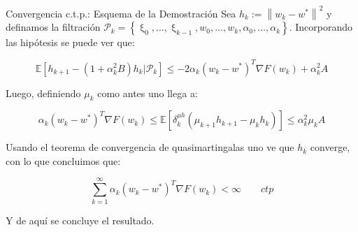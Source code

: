 \documentclass{beamer}
\newcommand{\F}{\mathcal{F}}
\newcommand{\norm}[1]{\left\lVert#1\right\rVert}
\newcommand{\sett}[1]{\left\lbrace#1\right\rbrace}
\newcommand{\expectation}[1]{\mathbb{E} \left[#1\right]}
\newcommand{\expectationfilt}[1]{\mathbb{E} \left[{#1} \vert \mathcal{P}_{k}\right]}
\begin{document}
%	
%	
%	
%	

\begin{frame}{Convergencia c.t.p.: Esquema de la Demostraci\'on}
Sea $h_k := \norm{w_k - w^*}^2$ y definamos  la filtraci\'on $\mathcal{P}_k = \sett{\upxi_{0}, \dots, \upxi_{k-1}, w_0, \dots, w_k, \alpha_0, \dots, \alpha_k}$. Incorporando las hip\'otesis se puede ver que:

\begin{footnotesize}
\begin{equation*}
\expectationfilt{h_{k+1} - \left(1 + \alpha_k^2 B\right)h_k } \leq  -2 \alpha_k \left(w_k - w^*\right)^T \nabla F(w_k) + \alpha_k^2 A
\end{equation*}
\end{footnotesize}

Luego, definiendo $\mu_k$ como antes uno llega a:

\begin{footnotesize}
\begin{equation*}
\alpha_k \left(w_k - w^* \right)^T\nabla F(w_k) \leq \expectation{\delta_k^{\mu h} \left(\mu_{k+1} h_{k+1} - \mu_k h_k \right)}  \leq  \alpha_k^2 \mu_k A
\end{equation*}
\end{footnotesize}


Usando el teorema de convergencia de quasimartingalas uno ve que $h_k$ converge, con lo que concluimos que:

\begin{footnotesize}
	\begin{equation*}
\sum\limits_{k=1}^{\infty} {\alpha_k \left(w_k - w^* \right)^T\nabla F(w_k)} < \infty \qquad ctp
\end{equation*}
\end{footnotesize}


Y de aqu\'i se concluye el resultado. 


\end{frame}
\end{document}
